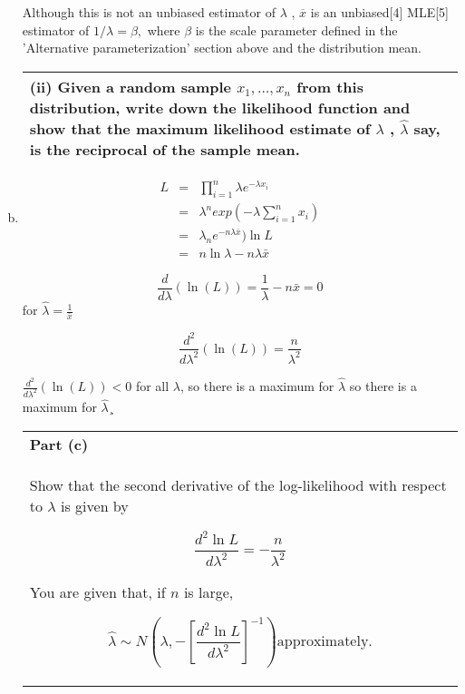 \documentclass[a4paper,12pt]{article}
\begin{document}
\begin{enumerate}[(a)]
Although this is not an unbiased estimator of 
${\displaystyle \lambda } $
, ${\displaystyle {\overline {x}}}$ 
 is an unbiased[4] MLE[5] estimator of 
${\displaystyle 1/\lambda =\beta ,} $
 where 
${\displaystyle \beta } $
 is the scale parameter defined in the 'Alternative parameterization' section above and the distribution mean. 
  \begin{table}[ht!]
  \centering
  \begin{tabular}{|p{15cm}|}
  \hline 
 (ii) Given a random sample $x_1,\ldots,x_n$ from this distribution, write down the likelihood function and show that the maximum likelihood estimate of $\lambda$ , $\hat{\lambda}$  say, is the reciprocal of the sample mean. 
\\ \hline 
   \end{tabular}
 \end{table}
 \item  \begin{eqnarray*}
L  &=& \prod^{n}_{i=1} \lambda e^{-\lambda x_i} \\
 &=& \lambda^n exp( - \lambda \sum^n_{i=1} x_i) \\
 &=& \lambda_n e^{-n\lambda \bar{x}} ) \ln L \\
&=& n \ln \lambda -n \lambda \bar{x}
\end{eqnarray*}

\[\frac{d}{d \lambda}(\ln(L)) = \frac{1}{\lambda} -  n \bar{x} = 0\] for 
$\hat{\lambda} = \frac{1}{\bar{x}}$

\[\frac{d^2}{d \lambda^2}(\ln(L)) = \frac{n}{\lambda^2}\] 

${\displaystyle \frac{d^2}{d \lambda^2}(\ln(L)) < 0  }$ for all $\lambda$, so there
is a maximum for $\hat{\lambda}$
so there is a maximum for $\hat{\lambda}$¸


 
  \begin{table}[ht!]
  \centering
  \begin{tabular}{|p{15cm}|}
  \hline 
\noindent \textbf{Part (c)} \\Show that the second derivative of the log-likelihood with respect to $\lambda$ is 
given by 
 
\[  \frac{d^2\ln L}{d\lambda^2} = - \frac{n}{\lambda^2} \]
 
  You are given that, if $n$ is large, 
 
 \[ \hat{\lambda} \sim N \left(\lambda , - \left[\frac{d^2\ln L}{d\lambda^2}   \right] ^{-1}   \right) \mbox{approximately}.    \]  
 

\end{tabular}
\end{table}
\end{enumerate}
\end{document}
